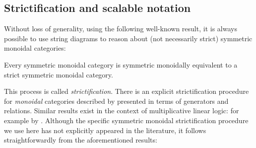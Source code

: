 \subsection{Strictification and scalable notation}
Without loss of generality, using the following well-known result, it is always possible to use string diagrams to
reason about (not necessarily strict) symmetric monoidal categories:
\begin{theorem}
  Every symmetric monoidal category is symmetric monoidally equivalent to a strict symmetric monoidal category.
\end{theorem}
This process is called \emph{strictification}. There is an explicit strictification
procedure for \emph{monoidal} categories described by \textcite{wilson} presented in terms of generators and relations.
Similar results exist in the context of multiplicative linear logic: for example by \textcite{robin}. Although the
specific symmetric monoidal strictification procedure we use here has not explicitly appeared in the literature,
it follows straightforwardly from the aforementioned results:
